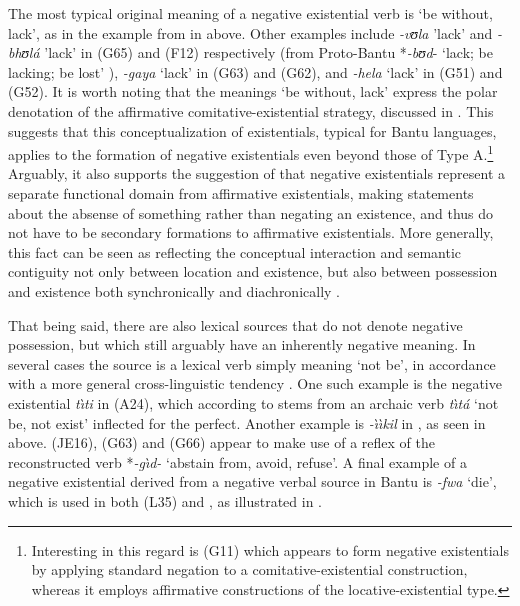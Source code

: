 \documentclass[output=paper,draft,draftmode,colorlinks,citecolor=brown]{langscibook}
\begin{document}
The most typical original meaning of a negative existential verb is `be
without, lack', as in the example from  in
 above. Other examples include \textit{-vʊla} 'lack' and
\textit{-bhʊlá} 'lack' in  (G65) and  (F12) respectively
(from Proto-Bantu *\textit{-bʊd}- `lack; be lacking; be lost'
\citep{BastinCoupez2002}), \textit{-gaya} `lack' in  (G63) and
 (G62), and \textit{-hela} `lack' in  (G51) and
 (G52). It is worth noting that the meanings `be without, lack'
express the polar denotation of the affirmative comitative-existential
strategy, discussed in . This suggests that this
conceptualization of existentials, typical for Bantu languages, applies to
the formation of negative existentials even beyond those of Type
A.\footnote{Interesting in this regard is  (G11) which appears to
form negative existentials by applying standard negation to a
comitative-existential construction, whereas it employs affirmative
constructions of the locative-existential type.} 
% 
Arguably, it also supports the suggestion of \citet{Veselinova2013} that
negative existentials represent a separate functional domain from
affirmative existentials, making statements about the absense of something
rather than negating an existence, and thus do not have to be secondary
formations to affirmative existentials. 
%
More generally, this fact can be seen as reflecting the conceptual interaction
and semantic contiguity not only between location and existence, but also
between possession and existence both synchronically and diachronically
\parencites(see e.g.)(){Koch1999}{Koch2012}{Heine1997}[see
also][]{Veselinova2013}.

That being said, there are also lexical sources that do not
denote negative possession, but which still arguably have an inherently
negative meaning. In several cases the source is a lexical verb simply
meaning `not be', in accordance with a more general cross-linguistic
tendency %
%
\parencites(see)(){Veselinova2013b-Bantu}{Veselinova2016}. One such example
is the
negative existential \textit{t{\`\i}ti} in  (A24), which
according to \citet{Ittmann1939,Ittmann1976} stems from an archaic verb
\textit{t{\`\i}tá} `not be, not exist' inflected for the perfect.
Another example is \textit{-{\`\i}{\`\i}kil} in , as seen in
 above.  (JE16),  (G63) and
 (G66) appear to make use of a reflex of the
reconstructed verb *\textit{-g{\`\i}d-} `abstain from, avoid, refuse'. A
final example of a negative existential derived from a negative verbal
source in Bantu is \textit{-fwa} `die', which is used in both 
(L35) and , as illustrated in .
\end{document}
